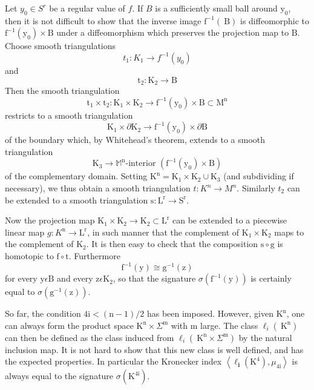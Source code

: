 \documentclass[10pt]{article}
\begin{document}
Let $y_{0} \in S^{r}$ be a regular value of $f$. If $B$ is a sufficiently small ball around $\mathrm{y}_{0}$, then it is not difficult to show that the inverse image $\mathrm{f}^{-1}(\mathrm{~B})$ is diffeomorphic to $\mathrm{f}^{-1}\left(\mathrm{y}_{0}\right) \times \mathrm{B}$ under a diffeomorphism which preserves the projection map to $\mathrm{B}$. Choose smooth triangulations
$$
t_{1}: K_{1} \rightarrow f^{-1}\left(y_{0}\right)
$$
and
$$
\mathrm{t}_{2}: \mathrm{K}_{2} \rightarrow \mathrm{B}
$$
Then the smooth triangulation
$$
\mathrm{t}_{1} \times \mathrm{t}_{2}: \mathrm{K}_{1} \times \mathrm{K}_{2} \rightarrow \mathrm{f}^{-1}\left(\mathrm{y}_{0}\right) \times \mathrm{B} \subset \mathrm{M}^{\mathrm{n}}
$$
restricts to a smooth triangulation
$$
\mathrm{K}_{1} \times \partial \mathrm{K}_{2} \rightarrow \mathrm{f}^{-1}\left(\mathrm{y}_{0}\right) \times \partial \mathrm{B}
$$
of the boundary which, by Whitehead's theorem, extends to a smooth triangulation
$$
\mathrm{K}_{3} \rightarrow \mathbb{M}^{\mathrm{n}} \text {-interior }\left(\mathrm{f}^{-1}\left(\mathrm{y}_{0}\right) \times \mathrm{B}\right)
$$
of the complementary domain. Setting $\mathrm{K}^{\mathrm{n}}=\mathrm{K}_{1} \times \mathrm{K}_{2} \cup \mathrm{K}_{3}$ (and subdividing if necessary), we thus obtain a smooth triangulation $t: K^{n} \rightarrow M^{n}$. Similarly $t_{2}$ can be extended to a smooth triangulation $\mathrm{s}: \mathrm{L}^{\mathrm{r}} \rightarrow \mathrm{S}^{\mathrm{r}}$.

Now the projection map $\mathrm{K}_{1} \times \mathrm{K}_{2} \rightarrow \mathrm{K}_{2} \subset \mathrm{L}^{\mathrm{r}}$ can be extended to a piecewise linear map $g: K^{\mathrm{n}} \rightarrow \mathrm{L}^{\mathrm{r}}$, in such manner that the complement of $\mathrm{K}_{1} \times \mathrm{K}_{2}$ maps to the complement of $\mathrm{K}_{2}$. It is then easy to check that the composition $\mathrm{s} \circ \mathrm{g}$ is homotopic to $\mathrm{f} \circ \mathrm{t}$. Furthermore
$$
\mathrm{f}^{-1}(\mathrm{y}) \cong \mathrm{g}^{-1}(\mathrm{z})
$$
for every $\mathrm{y} \epsilon \mathrm{B}$ and every $\mathrm{z} \epsilon \mathrm{K}_{2}$, so that the signature $\sigma\left(\mathrm{f}^{-1}(\mathrm{y})\right)$ is certainly equal to $\sigma\left(\mathrm{g}^{-1}(\mathrm{z})\right)$.

So far, the condition $4 \mathrm{i}<(\mathrm{n}-1) / 2$ has been imposed. However, given $\mathrm{K}^{\mathrm{n}}$, one can always form the product space $\mathrm{K}^{\mathrm{n}} \times \Sigma^{\mathrm{m}}$ with $\mathrm{m}$ large. The class $\ell_{i}\left(\mathrm{~K}^{\mathrm{n}}\right)$ can then be defined as the class induced from $\ell_{i}\left(\mathrm{~K}^{\mathrm{n}} \times \Sigma^{\mathrm{m}}\right)$ by the natural inclusion map. It is not hard to show that this new class is well defined, and has the expected properties. In particular the Kronecker index $\left\langle\ell_{\mathbf{i}}\left(\mathrm{K}^{4}\right), \mu_{4 \mathrm{i}}\right\rangle$ is always equal to the signature $\sigma\left(\mathrm{K}^{4 \mathrm{i}}\right)$.
\end{document}
